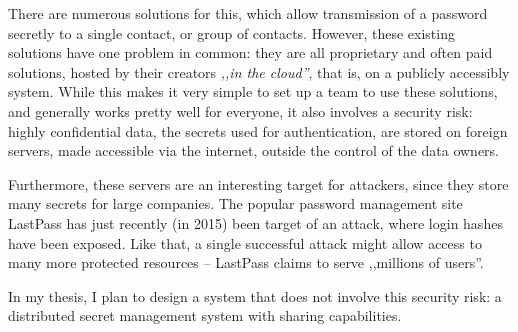 There are numerous solutions for this, which allow transmission of a password
secretly to a single contact, or group of contacts. However, these existing
solutions have one problem in common: they are all proprietary and often paid
solutions, hosted by their creators \emph{,,in the cloud''}, that is, on a
publicly accessibly system. While this makes it very simple to set up a team to
use these solutions, and generally works pretty well for everyone, it also
involves a security risk: highly confidential data, the secrets used for
authentication, are stored on foreign servers, made accessible via the
internet, outside the control of the data owners.

Furthermore, these servers are an interesting target for attackers, since they
store many secrets for large companies. The popular password management site
LastPass has just recently (in 2015) been target of an attack, where login
hashes have been exposed\cite{lastpass-security-notice}. Like that, a single
successful attack might allow access to many more protected resources --
LastPass claims to serve ,,millions of users''.

In my thesis, I plan to design a system that does not involve this security
risk: a distributed secret management system with sharing capabilities.

